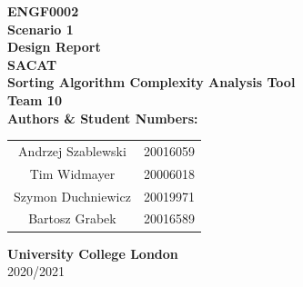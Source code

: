 \documentclass{article}
\begin{document}


\begin{titlepage}
    \begin{center}
        \vspace*{1cm}
            
        \LARGE
        \textbf{ENGF0002}\\
        \vspace{0.3cm}
        \textbf{Scenario 1}\\
        \vspace{0.3cm}
        \textbf{Design Report}\\
        \vspace{2cm}
        \huge
        \textbf{SACAT} \\
        \LARGE
        \vspace{0.3cm}
        \textbf{Sorting Algorithm Complexity Analysis Tool}\\
        \vspace{0.3cm}
        \vspace{1.0cm}
        \textbf{Team 10}\\
        \vspace{5cm}
        \textbf{Authors \& Student Numbers:}\\
        \vspace{0.3cm}
        \begin{center}
            \begin{tabular}{ c c }
                Andrzej Szablewski & 20016059 \\
                Tim Widmayer & 20006018 \\
                Szymon Duchniewicz & 20019971 \\
                Bartosz Grabek & 20016589 \\
            \end{tabular}
        \end{center}
            
        \vspace{3.0cm}    
        \textbf{University College London\\}
        \vspace{0.3cm}
        2020/2021%
            
    \end{center}
\end{titlepage}

\tableofcontents
\vspace{1cm}
\listoffigures
\end{document}
